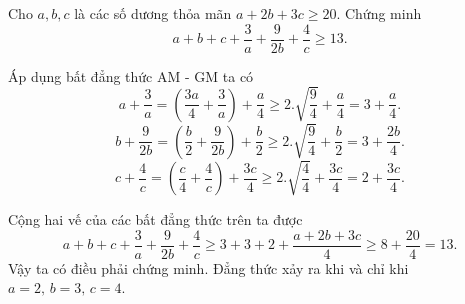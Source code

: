 \begin{problem}
	Cho $a, b, c$ là các số dương thỏa mãn $a + 2b + 3c \ge 20$. Chứng minh
	\[
		a + b + c + \frac{3}{a} + \frac{9}{2b} + \frac{4}{c} \ge 13.
	\]
	\solution

	Áp dụng bất đẳng thức AM - GM ta có
	\[
		a + \frac{3}{a} = \left( \frac{3a}{4} + \frac{3}{a} \right) + \frac{a}{4} \ge
		2.\sqrt{\frac{9}{4}} + \frac{a}{4} = 3 + \frac{a}{4}.
	\]
	\[
		b + \frac{9}{2b} = \left( \frac{b}{2} + \frac{9}{2b} \right) + \frac{b}{2} \ge 
		2.\sqrt{\frac{9}{4}} + \frac{b}{2} = 3 + \frac{2b}{4}.
	\]
	\[
		c + \frac{4}{c} = \left( \frac{c}{4} + \frac{4}{c} \right) + \frac{3c}{4} \ge 
		2.\sqrt{\frac{4}{4}} + \frac{3c}{4} = 2 + \frac{3c}{4}.
	\]

	Cộng hai vế của các bất đẳng thức trên ta được
	\[
		a + b + c + \frac{3}{a} + \frac{9}{2b} + \frac{4}{c} \ge 
		3 + 3 + 2 + \frac{a + 2b + 3c}{4} \ge 8 + \frac{20}{4} = 13.
	\]
	Vậy ta có điều phải chứng minh. Đẳng thức xảy ra khi và chỉ khi $a = 2,\, b = 3,\, c = 4$.
\end{problem}